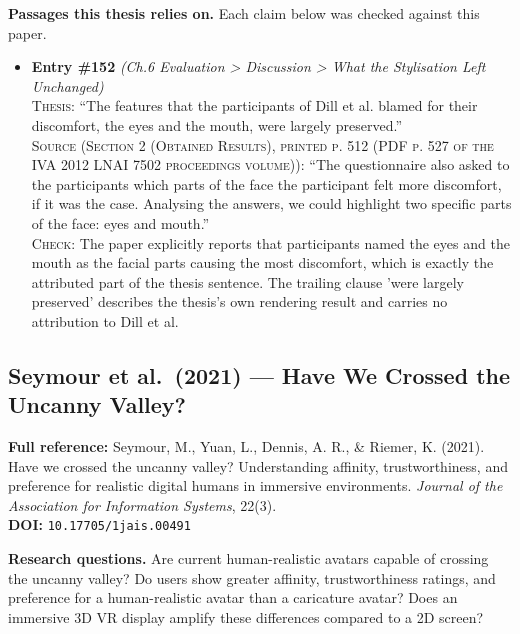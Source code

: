 \documentclass[11pt, a4paper]{article}
\begin{document}
\textbf{Passages this thesis relies on.} Each claim below was checked against this paper.
\begin{itemize}[leftmargin=1.2em,itemsep=4pt]
\item \textbf{Entry \#152} \textit{(Ch.6 Evaluation > Discussion > What the Stylisation Left Unchanged)}\\
\textsc{Thesis:} ``The features that the participants of Dill et al. blamed for their discomfort, the eyes and the mouth, were largely preserved.''\\
\textsc{Source (Section 2 (Obtained Results), printed p. 512 (PDF p. 527 of the IVA 2012 LNAI 7502 proceedings volume)):} ``The questionnaire also asked to the participants which parts of the face the participant felt more discomfort, if it was the case. Analysing the answers, we could highlight two specific parts of the face: eyes and mouth.''\\
\textsc{Check:} The paper explicitly reports that participants named the eyes and the mouth as the facial parts causing the most discomfort, which is exactly the attributed part of the thesis sentence. The trailing clause 'were largely preserved' describes the thesis's own rendering result and carries no attribution to Dill et al.
\end{itemize}

\vspace{8pt}
\subsection{Seymour et al.\ (2021) --- Have We Crossed the Uncanny Valley?}

\begin{refbox}
\textbf{Full reference:} Seymour, M., Yuan, L., Dennis, A. R., \& Riemer, K. (2021). Have we crossed the uncanny valley? Understanding affinity, trustworthiness, and preference for realistic digital humans in immersive environments. \textit{Journal of the Association for Information Systems}, 22(3).\\[4pt]
\textbf{DOI:} \texttt{10.17705/1jais.00491}
\end{refbox}

\textbf{Research questions.} Are current human-realistic avatars capable of crossing the uncanny valley? Do users show greater affinity, trustworthiness ratings, and preference for a human-realistic avatar than a caricature avatar? Does an immersive 3D VR display amplify these differences compared to a 2D screen?
\end{document}
